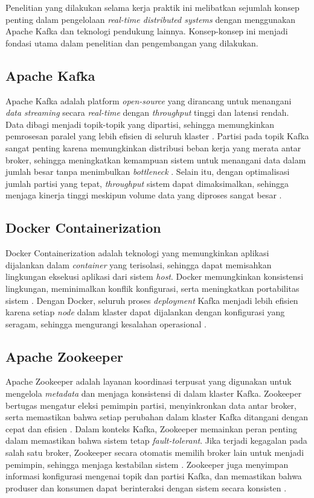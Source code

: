Penelitian yang dilakukan selama kerja praktik ini melibatkan sejumlah konsep penting dalam pengelolaan \textit{real-time distributed systems} dengan menggunakan Apache Kafka dan teknologi pendukung lainnya. Konsep-konsep ini menjadi fondasi utama dalam penelitian dan pengembangan yang dilakukan.

\subsection{Apache Kafka}

Apache Kafka adalah platform \textit{open-source} yang dirancang untuk menangani \textit{data streaming} secara \textit{real-time} dengan \textit{throughput} tinggi dan latensi rendah. Data dibagi menjadi topik-topik yang dipartisi, sehingga memungkinkan pemrosesan paralel yang lebih efisien di seluruh klaster \citep{elsevier:kafka}. Partisi pada topik Kafka sangat penting karena memungkinkan distribusi beban kerja yang merata antar broker, sehingga meningkatkan kemampuan sistem untuk menangani data dalam jumlah besar tanpa menimbulkan \textit{bottleneck} \citep{elsevier:kafka}. Selain itu, dengan optimalisasi jumlah partisi yang tepat, \textit{throughput} sistem dapat dimaksimalkan, sehingga menjaga kinerja tinggi meskipun volume data yang diproses sangat besar \citep{elsevier:kafka}.

\subsection{Docker Containerization}

Docker Containerization adalah teknologi yang memungkinkan aplikasi dijalankan dalam \textit{container} yang terisolasi, sehingga dapat memisahkan lingkungan eksekusi aplikasi dari sistem \textit{host}. Docker memungkinkan konsistensi lingkungan, meminimalkan konflik konfigurasi, serta meningkatkan portabilitas sistem \citep{its:docker}. Dengan Docker, seluruh proses \textit{deployment} Kafka menjadi lebih efisien karena setiap \textit{node} dalam klaster dapat dijalankan dengan konfigurasi yang seragam, sehingga mengurangi kesalahan operasional \citep{its:docker}.

\subsection{Apache Zookeeper}

Apache Zookeeper adalah layanan koordinasi terpusat yang digunakan untuk mengelola \textit{metadata} dan menjaga konsistensi di dalam klaster Kafka. Zookeeper bertugas mengatur eleksi pemimpin partisi, menyinkronkan data antar broker, serta memastikan bahwa setiap perubahan dalam klaster Kafka ditangani dengan cepat dan efisien \citep{comp:zookeeper}. Dalam konteks Kafka, Zookeeper memainkan peran penting dalam memastikan bahwa sistem tetap \textit{fault-tolerant}. Jika terjadi kegagalan pada salah satu broker, Zookeeper secara otomatis memilih broker lain untuk menjadi pemimpin, sehingga menjaga kestabilan sistem \citep{comp:zookeeper}. Zookeeper juga menyimpan informasi konfigurasi mengenai topik dan partisi Kafka, dan memastikan bahwa produser dan konsumen dapat berinteraksi dengan sistem secara konsisten \citep{comp:zookeeper}.


